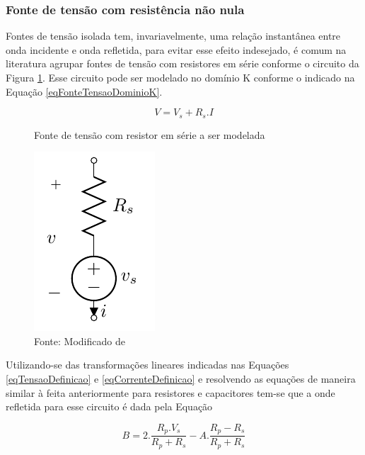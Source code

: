 		\subsubsection{Fonte de tensão com resistência não nula}
	\cite{Yeh2008} Fontes de tensão isolada tem, invariavelmente, uma relação instantânea entre onda incidente e onda refletida, para evitar esse efeito indesejado, é comum na literatura agrupar fontes de tensão com resistores em série conforme o circuito da Figura \ref{figFonteTensaoModelada}. Esse circuito pode ser modelado no domínio K conforme o indicado na Equação \ref{eqFonteTensaoDominioK}.
	
	\begin{equation}
		\label{eqFonteTensaoDominioK}
		V = V_s + R_s.I
	\end{equation}
	
	 \begin{figure}[h]
		\label{figFonteTensaoModelada}
		\caption{Fonte de tensão com resistor em série a ser modelada}
		\includegraphics[scale=0.5]{images/fonteTensaoModelada}
		\centering
		\caption*{Fonte: Modificado de \cite{Bogason2017}}
	\end{figure}
	
	Utilizando-se das transformações lineares indicadas nas Equações \ref{eqTensaoDefinicao} e \ref{eqCorrenteDefinicao} e resolvendo as equações de maneira similar à feita anteriormente para resistores e capacitores tem-se que a onde refletida para esse circuito é dada pela Equação 
	
	\begin{equation}
		\label{eqFonteTensaoDominioW}
		B = 2.\frac{R_p.V_s}{R_p+R_s}-A.\frac{R_p-R_s}{R_p+R_s}
	\end{equation}
	
